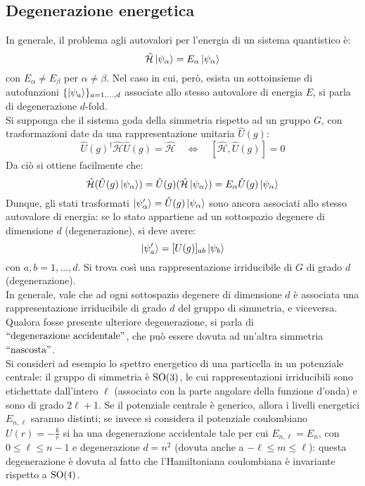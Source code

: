 \subsection{Degenerazione energetica}

In generale, il problema agli autovalori per l'energia di un sistema quantistico è:
\begin{equation*}
	\hat{\mathcal{H}} \ket{\psi_{\alpha}} = E_{\alpha} \ket{\psi_{\alpha}}
\end{equation*}
con $ E_{\alpha} \neq E_{\beta} $ per $ \alpha \neq \beta $. Nel caso in cui, però, esista un sottoinsieme di autofunzioni $ \{\ket{\psi_a}\}_{a = 1,\dots,d} $ associate allo stesso autovalore di energia $ E $, si parla di degenerazione $ d $-fold.\\
Si supponga che il sistema goda della simmetria rispetto ad un gruppo $ G $, con trasformazioni date da una rappresentazione unitaria $ \hat{U}(g) $:
\begin{equation*}
	\hat{U}(g)^{\dagger} \hat{\mathcal{H}} \hat{U}(g) = \hat{\mathcal{H}}
	\quad \Leftrightarrow \quad
	[\hat{\mathcal{H}}, \hat{U}(g)] = 0
\end{equation*}
Da ciò si ottiene facilmente che:
\begin{equation*}
	\hat{\mathcal{H}} (\hat{U}(g) \ket{\psi_{\alpha}}) = \hat{U}(g) (\hat{\mathcal{H}} \ket{\psi_{\alpha}}) = E_{\alpha} \hat{U}(g) \ket{\psi_{\alpha}}
\end{equation*}
Dunque, gli stati trasformati $ \ket{\psi'_{\alpha}} = \hat{U}(g) \ket{\psi_{\alpha}} $ sono ancora associati allo stesso autovalore di energia: se lo stato appartiene ad un sottospazio degenere di dimensione $ d $ (degenerazione), si deve avere:
\begin{equation*}
	\ket{\psi'_a} = [U(g)]_{ab} \ket{\psi_b}
\end{equation*}
con $ a,b = 1,\dots,d $. Si trova così una rappresentazione irriducibile di $ G $ di grado $ d $ (degenerazione).\\
In generale, vale che ad ogni sottospazio degenere di dimensione $ d $ è associata una rappresentazione irriducibile di grado $ d $ del gruppo di simmetria, e viceversa. Qualora fosse presente ulteriore degenerazione, si parla di $ ``\text{degenerazione accidentale}" $, che può essere dovuta ad un'altra simmetria $ ``\text{nascosta}" $.\\
Si consideri ad esempio lo spettro energetico di una particella in un potenziale centrale: il gruppo di simmetria è $ \mathrm{SO}(3) $, le cui rappresentazioni irriducibili sono etichettate dall'intero $ \ell $ (associato con la parte angolare della funzione d'onda) e sono di grado $ 2\ell + 1 $. Se il potenziale centrale è generico, allora i livelli energetici $ E_{n,\ell} $ saranno distinti; se invece si considera il potenziale coulombiano $ U(r) = - \frac{k}{r} $ si ha una degenerazione accidentale tale per cui $ E_{n,\ell} = E_n $, con $ 0 \le \ell \le n - 1 $ e degenerazione $ d = n^2 $ (dovuta anche a $ -\ell \le m \le \ell $): questa degenerazione è dovuta al fatto che l'Hamiltoniana coulombiana è invariante rispetto a $ \mathrm{SO}(4) $.

